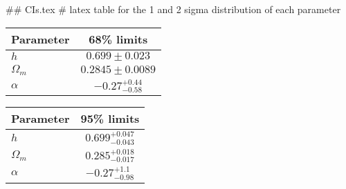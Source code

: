 ## CIs.tex
# latex table for the 1 and 2 sigma distribution of each parameter

\begin{tabular} { l  c}
 Parameter &  68\% limits\\
\hline
{\boldmath$h              $} & $0.699\pm 0.023            $\\
{\boldmath$\Omega_m       $} & $0.2845\pm 0.0089          $\\
{\boldmath$\alpha         $} & $-0.27^{+0.44}_{-0.58}     $\\
\hline
\end{tabular}

\begin{tabular} { l  c}
 Parameter &  95\% limits\\
\hline
{\boldmath$h              $} & $0.699^{+0.047}_{-0.043}   $\\
{\boldmath$\Omega_m       $} & $0.285^{+0.018}_{-0.017}   $\\
{\boldmath$\alpha         $} & $-0.27^{+1.1}_{-0.98}      $\\
\hline
\end{tabular}
